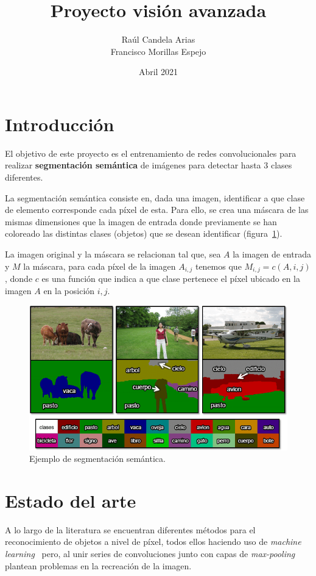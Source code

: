 \documentclass[a4paper]{article}
\title{Proyecto visión avanzada}
\author{Raúl Candela Arias \\ Francisco Morillas Espejo}
\date{Abril 2021}
\newcommand\imgScale {0.6}
\begin{document}
\maketitle

\section{Introducción}

El objetivo de este proyecto es el entrenamiento de redes convolucionales para realizar \textbf{segmentación semántica} de imágenes para detectar hasta 3 clases diferentes.
\newline

La segmentación semántica consiste en, dada una imagen, identificar a que clase de elemento corresponde cada píxel de esta.
Para ello, se crea una máscara de las mismas dimensiones que la imagen de entrada donde previamente se han coloreado las distintas clases (objetos) que se desean identificar (figura~\ref{fig:semanticSeg}).
\newline

La imagen original y la máscara se relacionan tal que, sea $A$ la imagen de entrada y $M$ la máscara, para cada píxel de la imagen $A_{i,j}$ tenemos que $M_{i,j} = c(A,i,j)$, donde $c$ es una función que indica a que clase pertenece el píxel ubicado en la imagen $A$ en la posición $i,j$.
\begin{figure}[htbp]
    \centering
    \includegraphics[scale=\imgScale]{img/EjSegSem.png}
    \caption{\small Ejemplo de segmentación semántica. \cite{Ref1}}
    \label{fig:semanticSeg}
\end{figure}

\section{Estado del arte}
A lo largo de la literatura se encuentran diferentes métodos para el reconocimiento de objetos a nivel de píxel, todos ellos haciendo uso de \textit{machine learning}~\cite{fabaret, long} pero, al unir series de convoluciones junto con capas de \textit{max-pooling} plantean problemas en la recreaci\'on de la imagen.
\newline
\end{document}
